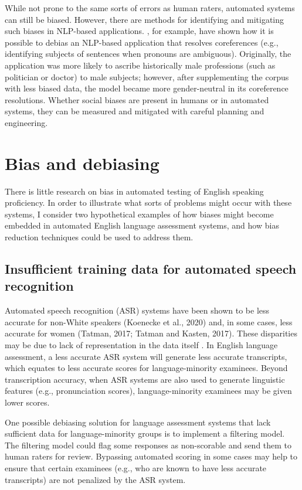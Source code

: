\documentclass [PhD] {uclathes}
\begin{document}
While not prone to the same sorts of errors as human raters, automated systems can still be biased. However, there are methods for identifying and mitigating such biases in NLP-based applications. \citet{zhao2018gender}, for example, have shown how it is possible to debias an NLP-based application that resolves coreferences (e.g., identifying subjects of sentences when pronouns are ambiguous). Originally, the application was more likely to ascribe historically male professions (such as politician or doctor) to male subjects; however, after supplementing the corpus with less biased data, the model became more gender-neutral in its coreference resolutions. Whether social biases are present in humans or in automated systems, they can be measured and mitigated with careful planning and engineering.

\section{Bias and debiasing}

There is little research on bias in automated testing of English speaking proficiency. In order to illustrate what sorts of problems might occur with these systems, I consider two hypothetical examples of how biases might become embedded in automated English language assessment systems, and how bias reduction techniques could be used to address them.

\subsection{Insufficient training data for automated speech recognition}

Automated speech recognition (ASR) systems have been shown to be less accurate for non-White speakers (Koenecke et al., 2020) and, in some cases, less accurate for women (Tatman, 2017; Tatman and Kasten, 2017). These disparities may be due to lack of representation in the data itself \citep[e.g.][]{zhao2018gender}. In English language assessment, a less accurate ASR system will generate less accurate transcripts, which equates to less accurate scores for language-minority examinees. Beyond transcription accuracy, when ASR systems are also used to generate linguistic features (e.g., pronunciation scores), language-minority examinees may be given lower scores.

One possible debiasing solution for language assessment systems that lack sufficient data for language-minority groups is to implement a filtering model. The filtering model could flag some responses as non-scorable and send them to human raters for review. Bypassing automated scoring in some cases may help to ensure that certain examinees (e.g., who are known to have less accurate transcripts) are not penalized by the ASR system.
\end{document}
